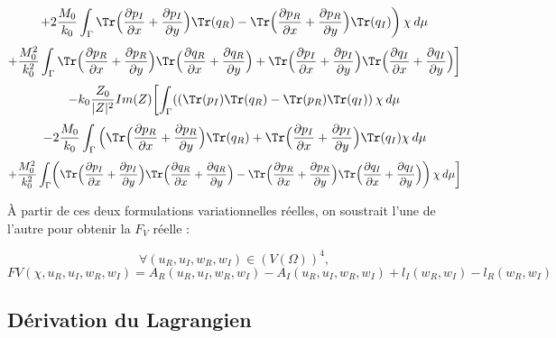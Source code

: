\[
+ 2 \frac{M_0}{k_0} \int_{\Gamma}   \Tr \Bigl( \frac{\partial p_I}{\partial x}+\frac{\partial p_I}{\partial y} \Bigr) \Tr(q_R) - \Tr \Bigl( \frac{\partial p_R}{\partial x}+\frac{\partial p_R}{\partial y} \Bigr) \Tr(q_I) \biggl)\hspace{2pt} \chi \hspace{2pt} d\mu 
\]
\[
+ \frac{M_0^2}{k_0^2}\int_{\Gamma} \Tr \Bigl( \frac{\partial p_R}{\partial x}+\frac{\partial p_R}{\partial y}\Bigr)\Tr\Bigl( \frac{\partial q_R}{\partial x}+\frac{\partial q_R}{\partial y}\Bigr) + \Tr \Bigl( \frac{\partial p_I}{\partial x}+\frac{\partial p_I}{\partial y}\Bigr)\Tr\Bigl( \frac{\partial q_I}{\partial x}+\frac{\partial q_I}{\partial y}\Bigr) \biggl]  \]
\[
- k_0\frac{Z_0}{|Z|^2}Im(Z)\biggl[ \int_{\Gamma} ( ( \Tr(p_I) \Tr(q_R) - \Tr(p_R) \Tr(q_I)) \hspace{2pt} \chi \hspace{2pt} d\mu \]
\[
- 2\frac{M_0}{k_0} \int_{\Gamma} \Big( \Tr \Bigl( \frac{\partial p_R}{\partial x}+\frac{\partial p_R}{\partial y} \Bigr) \Tr(q_R) + \Tr \Bigl( \frac{\partial p_I}{\partial x}+\frac{\partial p_I}{\partial y} \Bigr) \Tr(q_I) \chi \hspace{2pt} d\mu 
\]
\[
+ \frac{M_0^2}{k_0^2}\int_{\Gamma}
\biggl(\Tr \Bigl( \frac{\partial p_I}{\partial x}+\frac{\partial p_I}{\partial y}\Bigr)\Tr\Bigl( \frac{\partial q_R}{\partial x}+\frac{\partial q_R}{\partial y}\Bigr) - \Tr \Bigl( \frac{\partial p_R}{\partial x}+\frac{\partial p_R}{\partial y}\Bigr)\Tr\Bigl( \frac{\partial q_I}{\partial x}+\frac{\partial q_I}{\partial y}\Bigr) \biggl) \hspace{2pt} \chi  \hspace{2pt} d\mu \biggl]\]

\begin{tcolorbox}[colback=green!5!white,colframe=green!75!black,title=Théorème 6.2.2: Formulation variationnelle réelle]
À partir de ces deux formulations variationnelles réelles, on soustrait l'une de l'autre pour obtenir la $F_V$ réelle :

\[\forall (u_R,u_I,w_R,w_I)\in (V(\Omega))^4, \]
\begin{equation}
    FV(\chi, u_R, u_I, w_R, w_I) = A_R(u_R,u_I,w_R,w_I) - A_I(u_R,u_I,w_R,w_I) + l_I(w_R,w_I) - l_R(w_R,w_I)
\end{equation}

\end{tcolorbox}

\subsection{Dérivation du Lagrangien}


